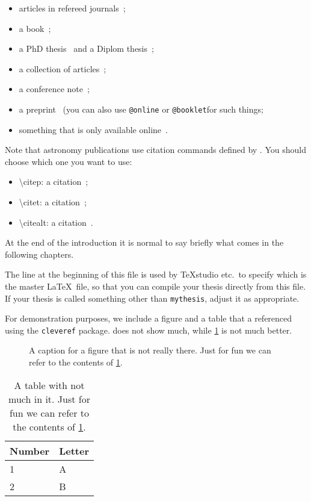 \begin{itemize}
\item articles in refereed journals~\citep{pdg2010,Aad:2010ey};
\item a book~\citep{Halzen:1984mc};
\item a PhD thesis~\citep{tlodd:2012} and a Diplom thesis~\citep{mergelmeyer:2011};
\item a collection of articles~\citep{lhc:vol1};
\item a conference note~\citep{ATLAS-CONF-2011-008};
\item a preprint~\citep{atlas:perf:2009} (you can also use
  \texttt{@online} or \texttt{@booklet}for such things;
\item something that is only available online~\citep{thesis-guide}.
\end{itemize}
Note that astronomy publications use citation commands defined by .
You should choose which one you want to use:
\begin{itemize}
\item \textbackslash citep: a citation~\citep{pdg2010,Aad:2010ey};
\item \textbackslash citet: a citation~\citet{pdg2010,Aad:2010ey};
\item \textbackslash citealt: a citation~\citealt{pdg2010,Aad:2010ey}.
\end{itemize}

At the end of the introduction it is normal to say briefly what comes
in the following chapters.

The line at the beginning of this file is used by TeXstudio etc.\ to
specify which is the master \LaTeX\ file, so that you can compile your thesis
directly from this file.
If your thesis is called something other than \texttt{mythesis}, adjust it as appropriate.

For demonstration purposes,
we include a figure and a table that a referenced using the \texttt{cleveref} package.
 does not show much,
while \cref{tab:little} is not much better.

\begin{figure}[htbp]
  \centering
  \fbox{\textcolor{red}{This is not really a figure!}}
  \caption{A caption for a figure that is not really there.
    Just for fun we can refer to the contents of \cref{tab:little}.}
  \label{fig:nothing}
\end{figure}

\begin{table}[htbp]
  \caption{A table with not much in it.
    Just for fun we can refer to the contents of \cref{fig:nothing}.}
  \label{tab:little}
  \centering
  \begin{tabular}{ll}
    \toprule
    Number & Letter \\
    \midrule
    1 & A \\
    2 & B \\
    \bottomrule  
  \end{tabular}
\end{table}

